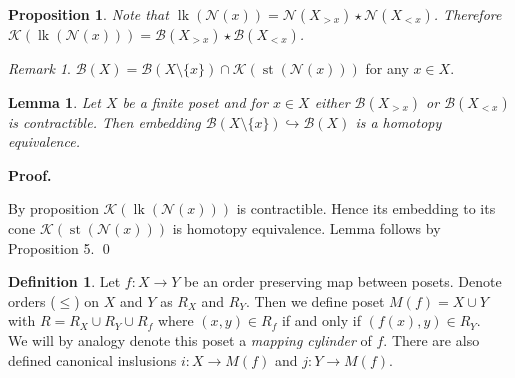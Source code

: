 \documentclass[a4paper, 12pt]{article}
\newtheorem{proposition}{Proposition}
\newtheorem{lemma}{Lemma}
\theoremstyle{definition}
\newtheorem{definition}{Definition}
\theoremstyle{remark}
\newtheorem{remark}{Remark}
\newenvironment{pf}{\noindent\textbf{Proof.} ~ \par}{\qed}
\newcommand{\define}[1]{{\textit{#1}}}
\renewcommand{\leq}{\leqslant}
\begin{document}
\begin{proposition}
  Note that $\operatorname{lk}(\mathcal{N}(x)) = \mathcal{N}(X_{>x}) \star \mathcal{N}(X_{<x})$. Therefore $\mathcal{K}(\operatorname{lk}(\mathcal{N}(x))) = \mathcal{B}(X_{>x}) \star \mathcal{B}(X_{<x})$.
\end{proposition}

\begin{remark}
  $\mathcal{B}(X) = \mathcal{B}(X \setminus \{x\}) \cap \mathcal{K}(\operatorname{st}(\mathcal{N}(x)))$ for any $x \in X$.\\
\end{remark}

\begin{lemma}
  Let $X$ be a finite poset and for $x \in X$ either $\mathcal{B}(X_{>x})$ or $\mathcal{B}(X_{<x})$ is contractible. Then embedding $\mathcal{B}(X \setminus \{x\}) \hookrightarrow \mathcal{B}(X)$ is a homotopy equivalence.
\end{lemma}

\begin{pf}
  By proposition $\mathcal{K}(\operatorname{lk}(\mathcal{N}(x)))$ is contractible. Hence its embedding to its cone $\mathcal{K}(\operatorname{st}(\mathcal{N}(x)))$ is homotopy equivalence. Lemma follows by Proposition 5.
\end{pf}

\begin{definition}
  Let $f : X \to Y$ be an order preserving map between posets. Denote orders ($\leq$) on $X$ and $Y$ as $R_X$ and $R_Y$. Then we define poset $M(f) = X \cup Y$ with $R = R_X \cup R_Y \cup R_{f}$ where $(x,y) \in R_f$ if and only if $(f(x),y) \in R_Y$.\\

  We will by analogy denote this poset a \define{mapping cylinder} of $f$. There are also defined canonical inslusions $i : X \to M(f)$ and $j : Y \to M(f)$.
\end{definition}
\end{document}
